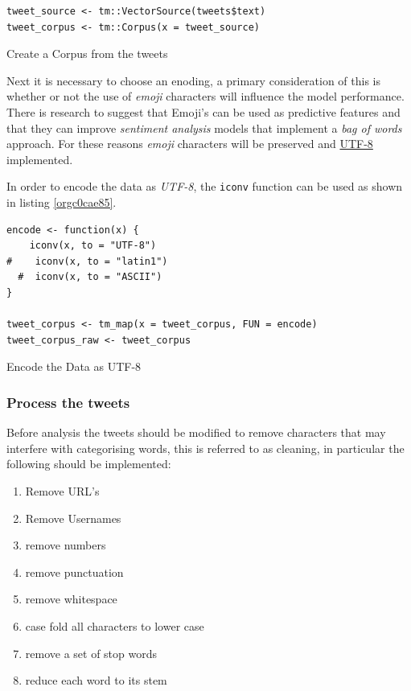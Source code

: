 \documentclass[11pt]{article}
\begin{document}
\begin{listing}[htbp]
\begin{verbatim}
tweet_source <- tm::VectorSource(tweets$text)
tweet_corpus <- tm::Corpus(x = tweet_source)
\end{verbatim}
\caption{\label{orgf04fc4c}Create a Corpus from the tweets}
\end{listing}

Next it is necessary to choose an enoding, a primary consideration of this is whether or not the use of \emph{emoji} characters will influence the model performance. There is research to suggest that Emoji's can be used as predictive features \cite{lecompte2017} and that they can improve \emph{sentiment analysis} models \cite{shiha2017} that implement a \emph{bag of words} approach. For these reasons \emph{emoji} characters will be preserved and \href{http://www.utf-8.com/}{UTF-8} implemented.

In order to encode the data as \emph{UTF-8}, the \texttt{iconv} function can be used as shown in listing \ref{orgc0cae85}.

\begin{listing}[htbp]
\begin{verbatim}
encode <- function(x) {
    iconv(x, to = "UTF-8")
#    iconv(x, to = "latin1")
  #  iconv(x, to = "ASCII")
}

tweet_corpus <- tm_map(x = tweet_corpus, FUN = encode)
tweet_corpus_raw <- tweet_corpus
\end{verbatim}
\caption{\label{orgc0cae85}Encode the Data as UTF-8}
\end{listing}

\subsubsection{Process the tweets}
\label{sec:orgee585d1}
Before analysis the tweets should be modified to remove characters that may interfere with categorising words, this is referred to as cleaning, in particular the following should be implemented:

\begin{enumerate}
\item Remove URL's
\item Remove Usernames
\item remove numbers
\item remove punctuation
\item remove whitespace
\item case fold all characters to lower case
\item remove a set of stop words
\item reduce each word to its stem
\end{enumerate}
\end{document}
